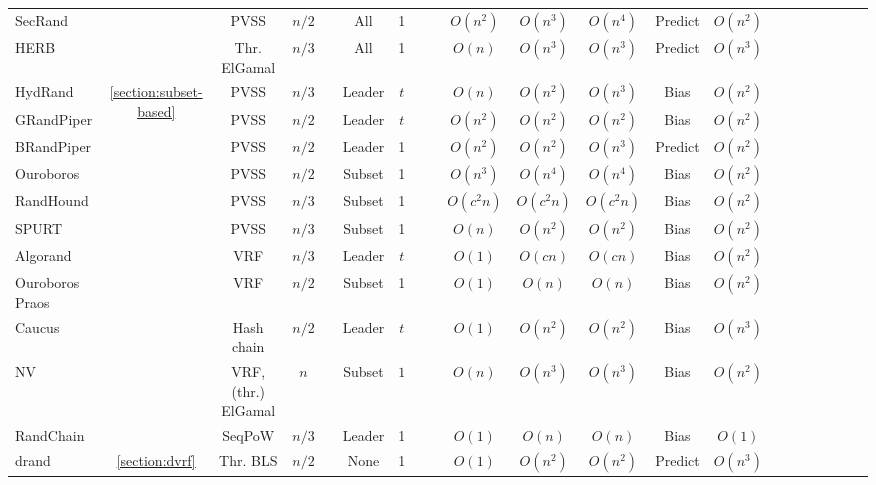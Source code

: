 \documentclass[letterpaper,twocolumn,10pt]{article}
\newcommand{\cmark}{\ding{51}}
\newcommand{\xmark}{\ding{55}}
\theoremstyle{definition}
\theoremstyle{remark}
\begin{document}
\begin{table*}[pt]
\begin{threeparttable}
\begin{tabularx}{\textwidth}{@{}l*{20}c}
SecRand &  & PVSS &  $n/2$  & \xmark   & All   & 1   & \cmark    & \cmark   & $O(n^2)$  & $O(n^3)$   & $O(n^4)$  & Predict & $O(n^2)$ \\ 
HERB &  & Thr. ElGamal & $n/3$   & \xmark   & All   & 1   & \cmark    & \cmark   & $O(n)$  & $O(n^3)$   & $O(n^3)$  & Predict & $O(n^3)$ \\ 
\midrule
HydRand & \multirow{11}{*}{\ref{section:subset-based}} & PVSS & $n/3$   & \xmark   & Leader   & $t$   & \cmark    & \xmark   & $O(n)$  & $O(n^2)$   & $O(n^3)$  & Bias & $O(n^2)$ \\ 
GRandPiper &  & PVSS  & $n/2$   & \xmark   & Leader   & $t$   & \cmark    & \xmark   & $O(n^2)$  & $O(n^2)$   & $O(n^2)$  & Bias & $O(n^2)$ \\ 
BRandPiper &  & PVSS  & $n/2$   & \xmark   & Leader   & 1   & \cmark    & \xmark   & $O(n^2)$  & $O(n^2)$   & $O(n^3)$  & Predict & $O(n^2)$ \\ 
Ouroboros &  & PVSS & $n/2$   & \xmark   & Subset   & 1   & \cmark    & \xmark   & $O(n^3)$  & $O(n^4)$   & $O(n^4)$  & Bias & $O(n^2)$ \\ 
RandHound &  & PVSS & $n/3$   & \xmark   & Subset   & 1   & \xmark    & \xmark   & $O(c^2 n)$  & $O(c^2n)$   & $O(c^2n)$  & Bias & $O(n^2)$ \\ 
SPURT &  & PVSS  & $n/3$   & \xmark   & Subset   & 1   & \cmark    & \cmark   & $O(n)$  & $O(n^2)$   & $O(n^2)$  & Bias & $O(n^2)$ \\ 
Algorand &  & VRF  & $n/3$   & \cmark    & Leader   & $t$   & \xmark    & \cmark   & $O(1)$  & $O(cn)$   & $O(cn)$  & Bias & $O(n^2)$ \\ 
Ouroboros Praos &  & VRF & $n/2$   & \cmark    & Subset   & 1   & \xmark    & \cmark   & $O(1)$  & $O(n)$   & $O(n)$  & Bias & $O(n^2)$ \\ 
Caucus &  & Hash chain &  $n/2$  & \cmark    & Leader   & $t$   & \xmark    & \cmark   & $O(1)$  & $O(n^2)$   & $O(n^2)$  & Bias & $O(n^3)$ \\ 
NV &  & VRF, (thr.) ElGamal &  $n$  & \xmark   & Subset   & $1$   & \xmark    & \xmark   & $O(n)$  & $O(n^3)$   & $O(n^3)$  & Bias & $O(n^2)$ \\ 
RandChain &  & SeqPoW &  $n/3$  & \cmark    & Leader   &  1  & \xmark    & \cmark   & $O(1)$  & $O(n)$   & $O(n)$  & Bias &  $O(1)$\\ 
\midrule
drand & \multirow{4}{*}{\ref{section:dvrf}} & Thr. BLS & $n/2$   & \xmark   & None   & 1   & \cmark    & \cmark   & $O(1)$  & $O(n^2)$   & $O(n^2)$  & Predict & $O(n^3)$ \\ 

\end{tabularx}
\end{threeparttable}
\end{table*}
\end{document}
